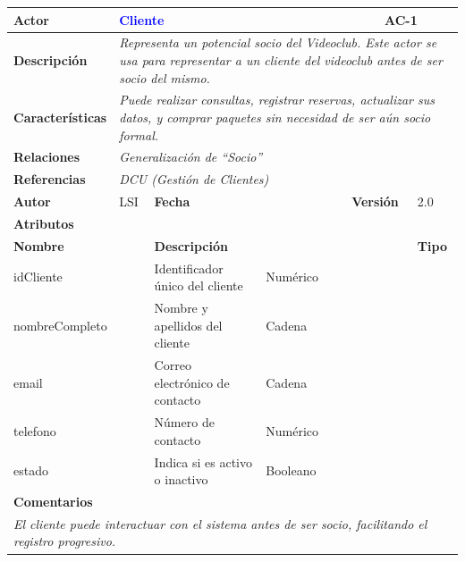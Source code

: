 \begin{table}[H]
    \begin{tabular}{|llllllll|}
    \hline
    \multicolumn{1}{|l|}{\textbf{Actor}}       & \multicolumn{5}{l|}{\textbf{\textcolor{blue}{Cliente}}}                                                  & \multicolumn{2}{l|}{\cellcolor[HTML]{E6E6E6}AC-1} \\ \hline
    \multicolumn{1}{|l|}{\textbf{Descripción}} & \multicolumn{7}{p{13cm}|}{{\color[HTML]{808080} \textit{Representa un potencial socio del Videoclub. Este actor se usa para representar a un cliente del videoclub antes de ser socio del mismo.}}} \\ \hline
    \multicolumn{1}{|l|}{\textbf{Características}} & \multicolumn{7}{p{13cm}|}{{\color[HTML]{808080} \textit{Puede realizar consultas, registrar reservas, actualizar sus datos, y comprar paquetes sin necesidad de ser aún socio formal.}}} \\ \hline
    \multicolumn{1}{|l|}{\textbf{Relaciones}}      & \multicolumn{7}{l|}{{\color[HTML]{808080} \textit{Generalización de “Socio”}}} \\ \hline
    \multicolumn{1}{|l|}{\textbf{Referencias}}     & \multicolumn{7}{l|}{{\color[HTML]{808080} \textit{DCU (Gestión de Clientes)}}} \\ \hline
    \multicolumn{1}{|l|}{\textbf{Autor}}           & \multicolumn{1}{l|}{LSI}                   & \multicolumn{2}{l|}{\textbf{Fecha}} & \multicolumn{1}{l|}{} & \multicolumn{2}{l|}{\textbf{Versión}} & 2.0 \\ \hline
    \multicolumn{8}{|l|}{\cellcolor[HTML]{F2F2F2}\textbf{Atributos}} \\ \hline
    \multicolumn{2}{|l|}{\textbf{Nombre}} & \multicolumn{5}{l|}{\textbf{Descripción}} & \textbf{Tipo} \\ \hline
    \multicolumn{2}{|l|}{idCliente} & Identificador único del cliente & Numérico \\ \hline
    \multicolumn{2}{|l|}{nombreCompleto} & Nombre y apellidos del cliente & Cadena \\ \hline
    \multicolumn{2}{|l|}{email} & Correo electrónico de contacto & Cadena \\ \hline
    \multicolumn{2}{|l|}{telefono} & Número de contacto & Numérico \\ \hline
    \multicolumn{2}{|l|}{estado} & Indica si es activo o inactivo & Booleano \\ \hline
    \multicolumn{8}{|l|}{\cellcolor[HTML]{F2F2F2}\textbf{Comentarios}} \\ \hline
    \multicolumn{8}{|p{15cm}|}{{\color[HTML]{808080} \textit{El cliente puede interactuar con el sistema antes de ser socio, facilitando el registro progresivo.}}} \\ \hline
    \end{tabular}
\end{table}


